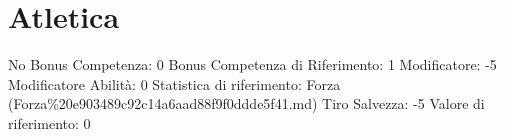 \section{Atletica}\label{atletica}

\begin{description}
\tightlist
\item[Tags: ABI]
No Bonus Competenza: 0 Bonus Competenza di Riferimento: 1 Modificatore:
-5 Modificatore Abilità: 0 Statistica di riferimento: Forza
(Forza\%20e903489c92c14a6aad88f9f0ddde5f41.md) Tiro Salvezza: -5 Valore
di riferimento: 0
\end{description}

